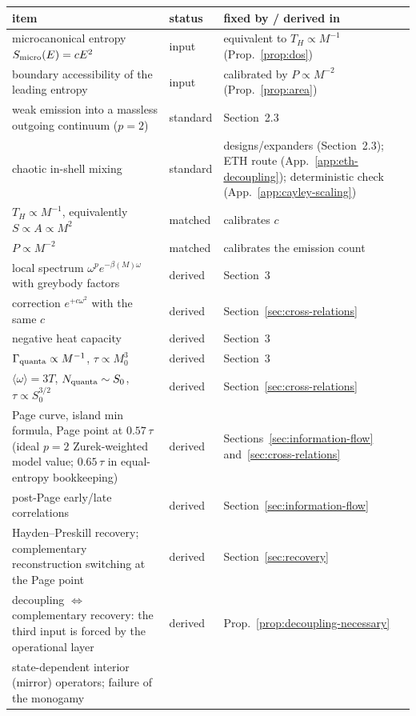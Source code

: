 \documentclass[12pt]{article}
\newcommand{\Smicro}{S_{\rm micro}}
\begin{document}
\begin{table}[H]
\centering
\small
\begin{tabular}{p{2.7in}lp{2.6in}}
\toprule
item & status & fixed by / derived in \\
\midrule
microcanonical entropy $\Smicro(E)=cE^2$ & input &
equivalent to $T_H\propto M^{-1}$ (Prop.~\ref{prop:dos}) \\
boundary accessibility of the leading entropy & input &
calibrated by $P\propto M^{-2}$ (Prop.~\ref{prop:area}) \\
weak emission into a massless outgoing continuum ($p=2$) & standard &
Section~2.3 \\
chaotic in-shell mixing & standard &
designs/expanders (Section~2.3); ETH route
(App.~\ref{app:eth-decoupling}); deterministic check
(App.~\ref{app:cayley-scaling}) \\
\midrule
$T_H\propto M^{-1}$, equivalently $S\propto A\propto M^2$ & matched &
calibrates $c$ \\
$P\propto M^{-2}$ & matched & calibrates the emission count \\
\midrule
local spectrum $\omega^pe^{-\beta(M)\omega}$ with greybody factors & derived &
Section~3 \\
correction $e^{+c\omega^2}$ with the same $c$ & derived &
Section~\ref{sec:cross-relations} \\
negative heat capacity & derived & Section~3 \\
$\Gamma_{\rm quanta}\propto M^{-1}$, $\tau\propto M_0^3$ & derived &
Section~3 \\
$\langle\omega\rangle=3T$, $N_{\rm quanta}\sim S_0$, $\tau\propto S_0^{3/2}$
& derived & Section~\ref{sec:cross-relations} \\
Page curve, island min formula, Page point at $0.57\,\tau$ (ideal
$p{=}2$ Zurek-weighted model value; $0.65\,\tau$ in equal-entropy
bookkeeping) & derived &
Sections~\ref{sec:information-flow} and~\ref{sec:cross-relations} \\
post-Page early/late correlations & derived &
Section~\ref{sec:information-flow} \\
Hayden--Preskill recovery; complementary reconstruction switching at the
Page point & derived & Section~\ref{sec:recovery} \\
decoupling $\Leftrightarrow$ complementary recovery: the third input is
forced by the operational layer & derived &
Prop.~\ref{prop:decoupling-necessary} \\
state-dependent interior (mirror) operators; failure of the monogamy

\end{tabular}
\end{table}
\end{document}
